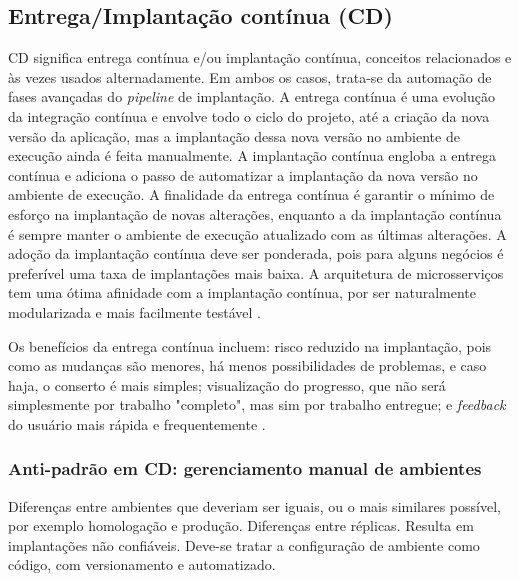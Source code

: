 

\subsection{Entrega/Implantação contínua (CD)}
CD significa entrega contínua e/ou implantação contínua, conceitos relacionados e às vezes usados alternadamente. Em ambos os casos, trata-se da automação de fases avançadas do \emph{pipeline} de implantação. A entrega contínua é uma evolução da integração contínua e envolve todo o ciclo do projeto, até a criação da nova versão da aplicação, mas a implantação dessa nova versão no ambiente de execução ainda é feita manualmente. A implantação contínua engloba a entrega contínua e adiciona o passo de automatizar a implantação da nova versão no ambiente de execução. A finalidade da entrega contínua é garantir o mínimo de esforço na implantação de novas alterações, enquanto a da implantação contínua é sempre manter o ambiente de execução atualizado com as últimas alterações. A adoção da implantação contínua deve ser ponderada, pois para alguns negócios é preferível uma taxa de implantações mais baixa. A arquitetura de microsserviços tem uma ótima afinidade com a implantação contínua, por ser naturalmente modularizada e mais facilmente testável \cite{gitlab-ci-cd,redhat-ci-cd}.

Os benefícios da entrega contínua incluem: risco reduzido na implantação, pois como as mudanças são menores, há menos possibilidades de problemas, e caso haja, o conserto é mais simples; visualização do progresso, que não será simplesmente por trabalho "completo", mas sim por trabalho entregue; e \emph{feedback} do usuário mais rápida e frequentemente \cite{martin-fowler-continuous-delivery}.

\subsubsection*{Anti-padrão em CD: gerenciamento manual de ambientes}
Diferenças entre ambientes que deveriam ser iguais, ou o mais similares possível, por exemplo homologação e produção. Diferenças entre réplicas. Resulta em implantações não confiáveis. Deve-se tratar a configuração de ambiente como código, com versionamento e automatizado. \cite{continuous-delivery-jez-humble}

